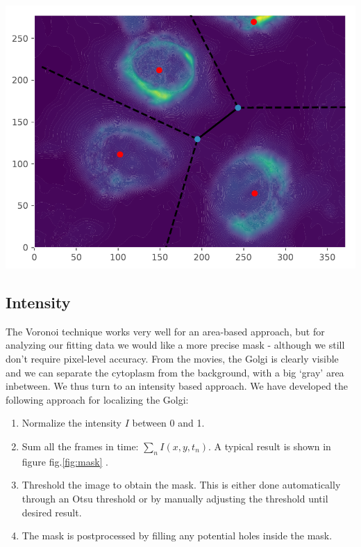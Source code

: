 \documentclass{Dissertate}
\let\origfigure\figure
\let\endorigfigure\endfigure
\renewenvironment{figure}[1][2] {
    \expandafter\origfigure\expandafter[H]
} {
    \endorigfigure
}
\providecommand{\tightlist}{%
  \setlength{\itemsep}{0pt}\setlength{\parskip}{0pt}}
\begin{document}
\begin{figure}
\hypertarget{fig:voronoi}{%
\centering
\includegraphics{source/figures/pdf/Voronoi.pdf}
\caption{The obtained mask. Red dots are cell centers, dashed lines
infinite edges and solid lines finite edges.}\label{fig:voronoi}
}
\end{figure}

\hypertarget{intensity}{%
\subsection{Intensity}\label{intensity}}

The Voronoi technique works very well for an area-based approach, but
for analyzing our fitting data we would like a more precise mask -
although we still don't require pixel-level accuracy. From the movies,
the Golgi is clearly visible and we can separate the cytoplasm from the
background, with a big `gray' area inbetween. We thus turn to an
intensity based approach. We have developed the following approach for
localizing the Golgi:

\begin{enumerate}
\def\labelenumi{\arabic{enumi}.}
\tightlist
\item
  Normalize the intensity \(I\) between 0 and 1.
\item
  Sum all the frames in time: \(\sum_n I(x, y, t_n)\). A typical result
  is shown in figure fig.\ref{fig:mask} .
\item
  Threshold the image to obtain the mask. This is either done
  automatically through an Otsu threshold or by manually adjusting the
  threshold until desired result.
\item
  The mask is postprocessed by filling any potential holes inside the
  mask.
\end{enumerate}
\end{document}
